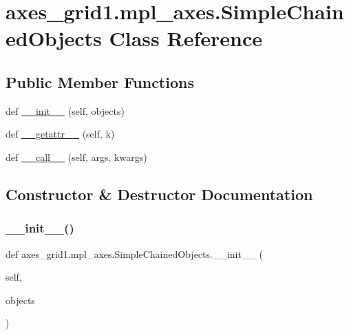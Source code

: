 \hypertarget{classaxes__grid1_1_1mpl__axes_1_1SimpleChainedObjects}{}\section{axes\+\_\+grid1.\+mpl\+\_\+axes.\+Simple\+Chained\+Objects Class Reference}
\label{classaxes__grid1_1_1mpl__axes_1_1SimpleChainedObjects}
\subsection*{Public Member Functions}
\begin{DoxyCompactItemize}
\item 
def \hyperlink{classaxes__grid1_1_1mpl__axes_1_1SimpleChainedObjects_a05d7c8dc8d6a1ad2d807c3c8470eea26}{\+\_\+\+\_\+init\+\_\+\+\_\+} (self, objects)
\item 
def \hyperlink{classaxes__grid1_1_1mpl__axes_1_1SimpleChainedObjects_a78c37bf29036fae9bc58e33a0630f2cd}{\+\_\+\+\_\+getattr\+\_\+\+\_\+} (self, k)
\item 
def \hyperlink{classaxes__grid1_1_1mpl__axes_1_1SimpleChainedObjects_af9fcaad7eb92ae20699c230b24002c2f}{\+\_\+\+\_\+call\+\_\+\+\_\+} (self, args, kwargs)
\end{DoxyCompactItemize}


\subsection{Constructor \& Destructor Documentation}
\mbox{\label{classaxes__grid1_1_1mpl__axes_1_1SimpleChainedObjects_a05d7c8dc8d6a1ad2d807c3c8470eea26}} 
\subsubsection{\texorpdfstring{\+\_\+\+\_\+init\+\_\+\+\_\+()}{\_\_init\_\_()}}
{\footnotesize\ttfamily def axes\+\_\+grid1.\+mpl\+\_\+axes.\+Simple\+Chained\+Objects.\+\_\+\+\_\+init\+\_\+\+\_\+ (\begin{DoxyParamCaption}\item[{}]{self,  }\item[{}]{objects }\end{DoxyParamCaption})}



